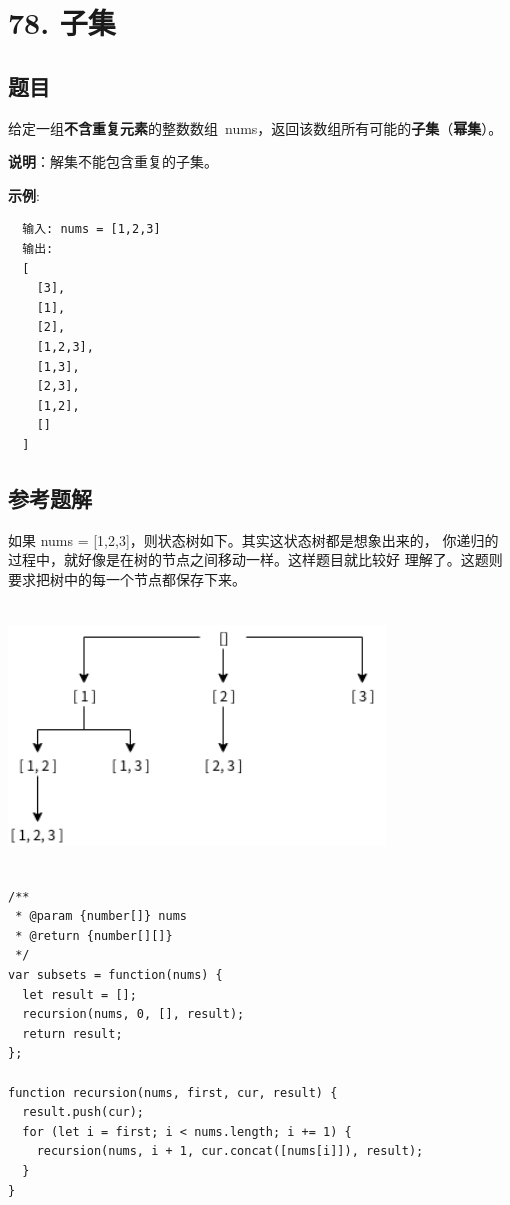 \newpage
\section{78. 子集}
\label{leetcode:78}

\subsection{题目}

给定一组\textbf{不含重复元素}的整数数组 nums，返回该数组所有可能的\textbf{子集}（\textbf{幂集}）。

\textbf{说明}：解集不能包含重复的子集。

\textbf{示例}:

\begin{verbatim}
  输入: nums = [1,2,3]
  输出:
  [
    [3],
    [1],
    [2],
    [1,2,3],
    [1,3],
    [2,3],
    [1,2],
    []
  ]
\end{verbatim}

\subsection{参考题解}

如果 nums = [1,2,3]，则状态树如下。其实这状态树都是想象出来的，
你递归的过程中，就好像是在树的节点之间移动一样。这样题目就比较好
理解了。这题则要求把树中的每一个节点都保存下来。

\includegraphics[width=100mm,height=70mm]{images/leetcode/leetcode_78.png}

\begin{verbatim}
/**
 * @param {number[]} nums
 * @return {number[][]}
 */
var subsets = function(nums) {
  let result = [];
  recursion(nums, 0, [], result);
  return result;
};

function recursion(nums, first, cur, result) {
  result.push(cur);
  for (let i = first; i < nums.length; i += 1) {
    recursion(nums, i + 1, cur.concat([nums[i]]), result);
  }
}
\end{verbatim}
